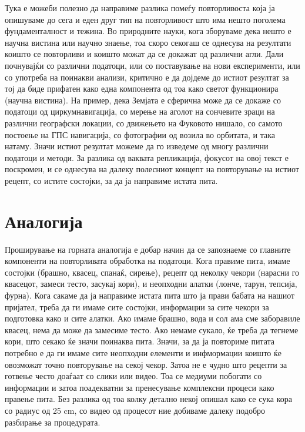 \documentclass[
]{book}
\begin{document}
Тука е можеби полезно да направиме разлика помеѓу повторливоста која ја опишуваме до сега и еден друг тип на повторливост што има нешто поголема фундаменталност и тежина. Во природните науки, кога зборуваме дека нешто е научна вистина или научно знаење, тоа скоро секогаш се однесува на резултати коишто се повторливи и коишто можат да се докажат од различни агли. Дали почнувајќи со различни податоци, или со поставување на нови експерименти, или со употреба на поинакви анализи, критично е да дојдеме до истиот резултат за тој да биде прифатен како една компонента од тоа како светот функционира (научна вистина). На пример, дека Земјата е сферична може да се докаже со податоци од циркумнавигација, со мерење на аголот на сончевите зраци на различни географски локации, со движењето на Фуковото нишало, со самото постоење на ГПС навигација, со фотографии од возила во орбитата, и така натаму. Значи истиот резултат можеме да го изведеме од многу различни податоци и методи. За разлика од ваквата репликација, фокусот на овој текст е поскромен, и се однесува на далеку полесниот концепт на повторување на истиот рецепт, со истите состојки, за да ја направиме истата пита.

\hypertarget{analogy}{%
\section{Аналогија}\label{analogy}}

Проширување на горната аналогија е добар начин да се запознаеме со главните компоненти на повторливата обработка на податоци. Кога правиме пита, имаме состојки (брашно, квасец, спанаќ, сирење), рецепт од неколку чекори (нарасни го квасецот, замеси тесто, засукај кори), и неопходни алатки (лонче, тарун, тепсија, фурна). Кога сакаме да ја направиме истата пита што ја прави бабата на нашиот пријател, треба да ги имаме сите состојки, информации за сите чекори за подготовка како и сите алатки. Ако имаме брашно, вода и сол ама сме заборавиле квасец, нема да може да замесиме тесто. Ако немаме сукало, ќе треба да тегнеме кори, што секако ќе значи поинаква пита. Значи, за да ја повториме питата потребно е да ги имаме сите неопходни елементи и инфмормации коишто ќе овозможат точно повторување на секој чекор. Затоа не е чудно што рецепти за готвење често доаѓаат со слики или видео. Тоа се медиуми побогати со информации и затоа поадекватни за пренесување комплексни процеси како правење пита. Без разлика од тоа колку детално некој опишал како се сука кора со радиус од 25 cm, со видео од процесот ние добиваме далеку подобро разбирање за процедурата.
\end{document}
